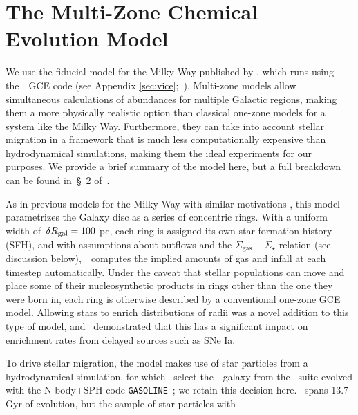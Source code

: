 \documentclass[ms.tex]{subfiles}
\begin{document}
\section{The Multi-Zone Chemical Evolution Model}
\label{sec:multizone}

We use the fiducial model for the Milky Way published by
\citet{Johnson2021}, which runs using the~\vice~GCE code (see Appendix
\ref{sec:vice};~\citealp{Johnson2020, Griffith2021a}).
Multi-zone models allow simultaneous calculations of abundances for multiple
Galactic regions, making them a more physically realistic option than classical
one-zone models for a system like the Milky Way.
Furthermore, they can take into account stellar migration in a framework that
is much less computationally expensive than hydrodynamical simulations, making
them the ideal experiments for our purposes.
We provide a brief summary of the model here, but a full breakdown can be found
in~\S~2 of~\citet{Johnson2021}.
\par
As in previous models for the Milky Way with similar motivations
\citep[e.g.][]{Matteucci1989, Schoenrich2009, Minchev2013, Minchev2014,
Minchev2017, Sharma2021}, this model parametrizes the Galaxy disc as a series
of concentric rings.
With a uniform width of~$\delta R_\text{gal} = 100$ pc, each ring is assigned its own
star formation history (SFH), and with assumptions about outflows and the
$\Sigma_\text{gas}-\dot{\Sigma}_\star$ relation (see discussion
below),~\vice~computes the implied amounts of gas and infall at each timestep
automatically.
Under the caveat that stellar populations can move and place some of their
nucleosynthetic products in rings other than the one they were born in, each
ring is otherwise described by a conventional one-zone GCE model.
Allowing stars to enrich distributions of radii was a novel addition to this
type of model, and~\citet{Johnson2021} demonstrated that this has a
significant impact on enrichment rates from delayed sources such as SNe Ia.
\par
To drive stellar migration, the model makes use of star particles from a
hydrodynamical simulation, for which~\citet{Johnson2021} select the~\hsim~galaxy
from the~\citet{Christensen2012} suite evolved with the N-body+SPH code
\texttt{GASOLINE}~\citep{Wadsley2004}; we retain this decision here.
\hsim~spans 13.7 Gyr of evolution, but the sample of star particles with
\end{document}
